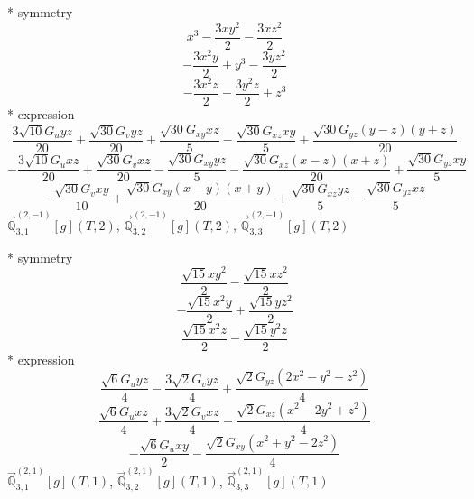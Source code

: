 \documentclass[fleqn,8pt]{jsarticle}
\begin{document}
\noindent\quad ** symmetry
\begin{dmath*}
x^{3} - \frac{3 x y^{2}}{2} - \frac{3 x z^{2}}{2}
\end{dmath*}
\begin{dmath*}
- \frac{3 x^{2} y}{2} + y^{3} - \frac{3 y z^{2}}{2}
\end{dmath*}
\begin{dmath*}
- \frac{3 x^{2} z}{2} - \frac{3 y^{2} z}{2} + z^{3}
\end{dmath*}
\noindent\quad ** expression
\begin{dmath*}
\frac{3 \sqrt{10} G_{u} y z}{20} + \frac{\sqrt{30} G_{v} y z}{20} + \frac{\sqrt{30} G_{xy} x z}{5} - \frac{\sqrt{30} G_{xz} x y}{5} + \frac{\sqrt{30} G_{yz} \left(y - z\right) \left(y + z\right)}{20}
\end{dmath*}
\begin{dmath*}
- \frac{3 \sqrt{10} G_{u} x z}{20} + \frac{\sqrt{30} G_{v} x z}{20} - \frac{\sqrt{30} G_{xy} y z}{5} - \frac{\sqrt{30} G_{xz} \left(x - z\right) \left(x + z\right)}{20} + \frac{\sqrt{30} G_{yz} x y}{5}
\end{dmath*}
\begin{dmath*}
- \frac{\sqrt{30} G_{v} x y}{10} + \frac{\sqrt{30} G_{xy} \left(x - y\right) \left(x + y\right)}{20} + \frac{\sqrt{30} G_{xz} y z}{5} - \frac{\sqrt{30} G_{yz} x z}{5}
\end{dmath*}
\noindent\quad $\vec{\mathbb{Q}}_{3,1}^{(2,-1)}[g](T,2)$, $\vec{\mathbb{Q}}_{3,2}^{(2,-1)}[g](T,2)$, $\vec{\mathbb{Q}}_{3,3}^{(2,-1)}[g](T,2)$

\noindent\quad ** symmetry
\begin{dmath*}
\frac{\sqrt{15} x y^{2}}{2} - \frac{\sqrt{15} x z^{2}}{2}
\end{dmath*}
\begin{dmath*}
- \frac{\sqrt{15} x^{2} y}{2} + \frac{\sqrt{15} y z^{2}}{2}
\end{dmath*}
\begin{dmath*}
\frac{\sqrt{15} x^{2} z}{2} - \frac{\sqrt{15} y^{2} z}{2}
\end{dmath*}
\noindent\quad ** expression
\begin{dmath*}
\frac{\sqrt{6} G_{u} y z}{4} - \frac{3 \sqrt{2} G_{v} y z}{4} + \frac{\sqrt{2} G_{yz} \left(2 x^{2} - y^{2} - z^{2}\right)}{4}
\end{dmath*}
\begin{dmath*}
\frac{\sqrt{6} G_{u} x z}{4} + \frac{3 \sqrt{2} G_{v} x z}{4} - \frac{\sqrt{2} G_{xz} \left(x^{2} - 2 y^{2} + z^{2}\right)}{4}
\end{dmath*}
\begin{dmath*}
- \frac{\sqrt{6} G_{u} x y}{2} - \frac{\sqrt{2} G_{xy} \left(x^{2} + y^{2} - 2 z^{2}\right)}{4}
\end{dmath*}
\noindent\quad $\vec{\mathbb{Q}}_{3,1}^{(2,1)}[g](T,1)$, $\vec{\mathbb{Q}}_{3,2}^{(2,1)}[g](T,1)$, $\vec{\mathbb{Q}}_{3,3}^{(2,1)}[g](T,1)$
\end{document}
